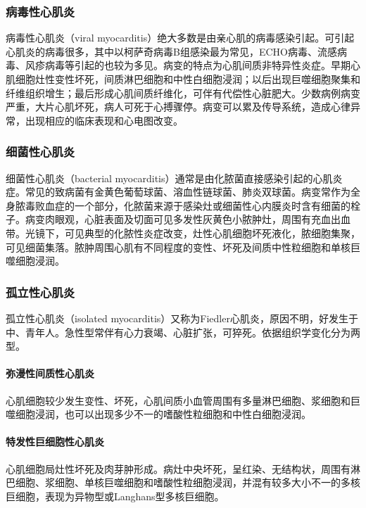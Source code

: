 \subsubsection{病毒性心肌炎}

病毒性心肌炎（viral
myocarditis）绝大多数是由亲心肌的病毒感染引起。可引起心肌炎的病毒很多，其中以柯萨奇病毒B组感染最为常见，ECHO病毒、流感病毒、风疹病毒等引起的也较为多见。病变的特点为心肌间质非特异性炎症。早期心肌细胞灶性变性坏死，间质淋巴细胞和中性白细胞浸润；以后出现巨噬细胞聚集和纤维组织增生；最后形成心肌间质纤维化，可伴有代偿性心脏肥大。少数病例病变严重，大片心肌坏死，病人可死于心搏骤停。病变可以累及传导系统，造成心律异常，出现相应的临床表现和心电图改变。

\subsubsection{细菌性心肌炎}

细菌性心肌炎（bacterial
myocarditis）通常是由化脓菌直接感染引起的心肌炎症。常见的致病菌有金黄色葡萄球菌、溶血性链球菌、肺炎双球菌。病变常作为全身脓毒败血症的一个部分，化脓菌来源于感染灶或细菌性心内膜炎时含有细菌的栓子。病变肉眼观，心脏表面及切面可见多发性灰黄色小脓肿灶，周围有充血出血带。光镜下，可见典型的化脓性炎症改变，灶性心肌细胞坏死液化，脓细胞集聚，可见细菌集落。脓肿周围心肌有不同程度的变性、坏死及间质中性粒细胞和单核巨噬细胞浸润。

\subsubsection{孤立性心肌炎}

孤立性心肌炎（isolated
myocarditis）又称为Fiedler心肌炎，原因不明，好发生于中、青年人。急性型常伴有心力衰竭、心脏扩张，可猝死。依据组织学变化分为两型。

\paragraph{弥漫性间质性心肌炎}
心肌细胞较少发生变性、坏死，心肌间质小血管周围有多量淋巴细胞、浆细胞和巨噬细胞浸润，也可以出现多少不一的嗜酸性粒细胞和中性白细胞浸润。

\paragraph{特发性巨细胞性心肌炎}
心肌细胞局灶性坏死及肉芽肿形成。病灶中央坏死，呈红染、无结构状，周围有淋巴细胞、浆细胞、单核巨噬细胞和嗜酸性粒细胞浸润，并混有较多大小不一的多核巨细胞，表现为异物型或Langhans型多核巨细胞。

